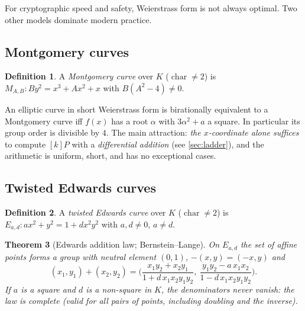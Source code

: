 \documentclass[11pt,a4paper,oneside]{book}
\theoremstyle{plain}
\newtheorem{theorem}{Theorem}[chapter]
\theoremstyle{definition}
\newtheorem{definition}[theorem]{Definition}
\theoremstyle{remark}
\begin{document}
For cryptographic speed and safety, Weierstrass form is not always optimal. Two other models dominate modern practice.

\subsection{Montgomery curves}

\begin{definition}
A \emph{Montgomery curve} over $K$ ($\operatorname{char}\ne2$) is $M_{A,B}:By^2=x^3+Ax^2+x$ with $B(A^2-4)\ne0$.
\end{definition}

An elliptic curve in short Weierstrass form is birationally equivalent to a Montgomery curve iff $f(x)$ has a root $\alpha$ with $3\alpha^2+a$ a square. In particular its group order is divisible by $4$. The main attraction: \emph{the $x$-coordinate alone suffices} to compute $[k]P$ with a \emph{differential addition} (see \cref{sec:ladder}), and the arithmetic is uniform, short, and has no exceptional cases.

\subsection{Twisted Edwards curves}

\begin{definition}
A \emph{twisted Edwards curve} over $K$ ($\operatorname{char}\ne2$) is $E_{a,d}:ax^2+y^2=1+dx^2y^2$ with $a,d\ne0$, $a\ne d$.
\end{definition}

\begin{theorem}[Edwards addition law; Bernstein--Lange]\label{thm:edwards}
On $E_{a,d}$ the set of affine points forms a group with neutral element $(0,1)$, $-(x,y)=(-x,y)$ and
\[
(x_1,y_1)+(x_2,y_2)=\Big(\frac{x_1y_2+x_2y_1}{1+d\,x_1x_2y_1y_2},\ \frac{y_1y_2-a\,x_1x_2}{1-d\,x_1x_2y_1y_2}\Big).
\]
If $a$ is a square and $d$ is a non-square in $K$, the denominators never vanish: the law is \emph{complete} (valid for all pairs of points, including doubling and the inverse). 
\end{theorem}
\end{document}
